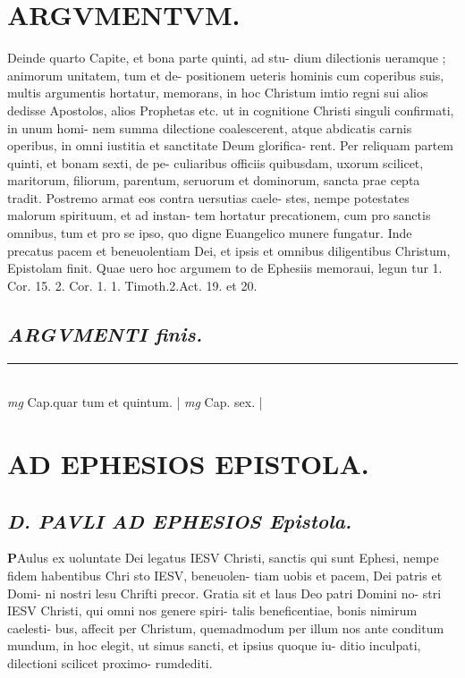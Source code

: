 \documentclass{article}
\begin{document}
\begin{pages}
\section*{ARGVMENTVM.  }\pstart Deinde quarto Capite, et bona parte quinti, ad stu- dium dilectionis ueramque ; animorum unitatem, tum et de- positionem ueteris hominis cum coperibus suis, multis argumentis hortatur, memorans, in hoc Christum imtio regni sui alios dedisse Apostolos, alios Prophetas etc. ut in cognitione Christi singuli confirmati, in unum homi- nem summa dilectione coalescerent, atque  abdicatis carnis operibus, in omni iustitia et sanctitate Deum glorifica- rent.  Per reliquam partem quinti, et bonam sexti, de pe- culiaribus officiis quibusdam, uxorum scilicet, maritorum, filiorum, parentum, seruorum et dominorum, sancta prae cepta tradit.  Postremo armat eos contra uersutias caele- stes, nempe potestates malorum spirituum, et ad instan- tem hortatur precationem, cum pro sanctis omnibus, tum et pro se ipso, quo digne Euangelico munere fungatur.  Inde precatus pacem et beneuolentiam Dei, et ipsis et omnibus diligentibus Christum, Epistolam finit. Quae uero hoc argumem to de Ephesiis memoraui, legun tur 1. Cor. 15.  2. Cor. 1.  1. Timoth.2.Act. 19. et 20.  \pend
{}
{}
\subsection*{\textit{ARGVMENTI finis.  }}
\vspace{0.5cm}\noindent
\vspace{0.2cm}\rule{1cm}{0.2pt}\\ 
\hspace{0.2cm}\textit{mg}
\footnotesize Cap.quar tum et quintum.  
\normalsize| 
\hspace{0.2cm}\textit{mg}
\footnotesize Cap.  sex.  
\normalsize| 
\section*{AD EPHESIOS EPISTOLA. }
\marginpar{[ p.9 ]}
\marginpar{[ p.1.  ]}
\marginpar{[ p.2.  ]}
\marginpar{[ p.B ]}
{}
\subsection*{\textit{D. PAVLI AD EPHESIOS Epistola.  }}\pstart \huge\textbf{P}\normalsize Aulus ex uoluntate Dei legatus IESV Christi, sanctis qui sunt Ephesi, nempe fidem habentibus Chri sto IESV, beneuolen- tiam uobis et pacem, Dei patris et Domi- ni nostri lesu Chrifti precor.  \pend\pstart Gratia sit et laus Deo patri Domini no- stri IESV Christi, qui omni nos genere spiri- talis beneficentiae, bonis nimirum caelesti- bus, affecit per Christum, quemadmodum per illum nos ante conditum mundum, in hoc elegit, ut simus sancti, et ipsius quoque  iu- ditio inculpati, dilectioni scilicet proximo- rumdediti.  \pend

\end{pages}
\end{document}
